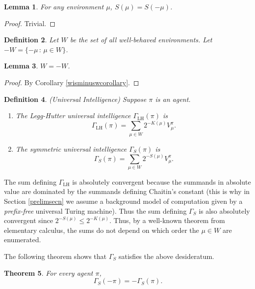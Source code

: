 \documentclass{article}
\newtheorem{theorem}{Theorem}
\newtheorem{definition}[theorem]{Definition}
\newtheorem{lemma}[theorem]{Lemma}
\def\LH{\textrm{LH}}
\def\SYM{S}
\begin{document}
\begin{lemma}
\label{Sissymmetriclemma}
    For any environment $\mu$, $S(\mu) = S(-\mu)$.
\end{lemma}

\begin{proof}
    Trivial.
\end{proof}

\begin{definition}
    Let $W$ be the set of all well-behaved environments.
    Let $-W=\{-\mu\,:\,\mu\in W\}$.
\end{definition}

\begin{lemma}
\label{WequalsminusWlemma}
$W=-W$.
\end{lemma}

\begin{proof}
    By Corollary \ref{wisminuswcorollary}.
\end{proof}

\begin{definition}
\label{universalintelligencedefn}
(Universal Intelligence)
    Suppose $\pi$ is an agent.
    \begin{enumerate}
        \item
        The \emph{Legg-Hutter universal intelligence} $\Gamma_{\LH}(\pi)$ is
        \[
            \Gamma_{\LH}(\pi) = \sum_{\mu \in W} 2^{-K(\mu)}V^\pi_\mu.
        \]
        \item
        The \emph{symmetric universal intelligence} $\Gamma_{\SYM}(\pi)$ is
        \[
            \Gamma_{\SYM}(\pi) = \sum_{\mu\in W} 2^{-S(\mu)}V^\pi_\mu.
        \]
    \end{enumerate}
\end{definition}

The sum defining $\Gamma_{\LH}$ is absolutely convergent because the summands
in absolute value are dominated by the summands defining Chaitin's constant
(this is why in Section \ref{prelimsecn} we assume a background model of computation
given by a \emph{prefix-free} universal Turing machine).
Thus the sum defining
$\Gamma_{\SYM}$ is also
absolutely convergent since $2^{-S(\mu)}\leq 2^{-K(\mu)}$. Thus, by a well-known
theorem from elementary calculus, the sums do not depend on which order the $\mu\in W$
are enumerated.

The following theorem shows that $\Gamma_{\SYM}$ satisfies the above desideratum.

\begin{theorem}
\label{maintheorem}
    For every agent $\pi$,
    \[
        \Gamma_{\SYM}(-\pi) = -\Gamma_{\SYM}(\pi).
    \]
\end{theorem}
\end{document}
